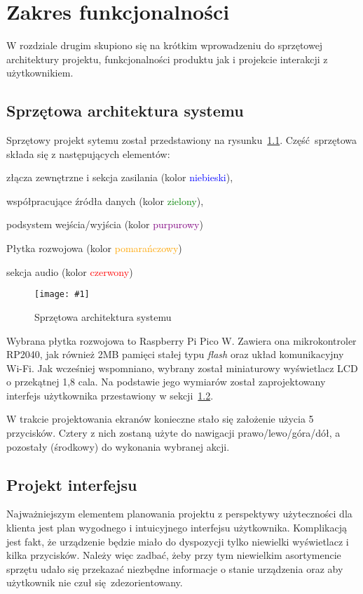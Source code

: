 \documentclass[polish]{aghengthesis}
\let\tempone\itemize
\let\temptwo\enditemize
\renewenvironment{itemize}{\tempone\setlength{\itemsep}{0cm}}{\temptwo}
\newcommand{\imgint}[4]{
	\begin{figure}[{#4}]
		\centering
		\texttt{[image: \#1]}
		\caption{#2}
		\label{#1}
	\end{figure}
}
\newcommand{\imgh}[3]{\imgint{#1}{#2}{#3}{H}}
\begin{document}
\chapter{Zakres funkcjonalności}
	W rozdziale drugim skupiono się na krótkim wprowadzeniu do sprzętowej architektury projektu, funkcjonalności produktu jak i projekcie interakcji z użytkownikiem.\\
	
	\section{Sprzętowa architektura systemu}
		Sprzętowy projekt sytemu został przedstawiony na rysunku~\ref{2/PicoRadio-hw-blocks}. Część sprzętowa składa się z następujących elementów:
		\begin{itemize}
			\item złącza zewnętrzne i sekcja zasilania (kolor \textcolor{blue}{niebieski}),
			\item współpracujące źródła danych (kolor \textcolor{green}{zielony}),
			\item podsystem wejścia/wyjścia (kolor \textcolor{purple}{purpurowy})
			\item Płytka rozwojowa (kolor \textcolor{orange}{pomarańczowy})
			\item sekcja audio (kolor \textcolor{red}{czerwony})
		\end{itemize}
		
		\imgh{2/PicoRadio-hw-blocks}{Sprzętowa architektura systemu}{0.95}
		
		Wybrana płytka rozwojowa to Raspberry Pi Pico W. Zawiera ona mikrokontroler RP2040, jak również 2MB pamięci stałej typu \textit{flash} oraz układ komunikacyjny Wi-Fi.
		Jak wcześniej wspomniano, wybrany został miniaturowy wyświetlacz LCD o przekątnej 1,8 cala. Na podstawie jego wymiarów został zaprojektowany interfejs użytkownika przestawiony w sekcji~\ref{sec:ui}.
		\clearpage
		
		W trakcie projektowania ekranów konieczne stało się założenie użycia 5 przycisków. Cztery z nich zostaną użyte do nawigacji prawo/lewo/góra/dół, a pozostały (środkowy) do wykonania wybranej akcji.
	
	\section{Projekt interfejsu}
		\label{sec:ui}
		Najważniejszym elementem planowania projektu z perspektywy użyteczności dla klienta jest plan wygodnego i intuicyjnego interfejsu użytkownika. Komplikacją jest fakt, że urządzenie będzie miało do dyspozycji tylko niewielki wyświetlacz i kilka przycisków.
		Należy więc zadbać, żeby przy tym niewielkim asortymencie sprzętu udało się przekazać niezbędne informacje o stanie urządzenia oraz aby użytkownik nie czuł się zdezorientowany.
		$ $\\
\end{document}
